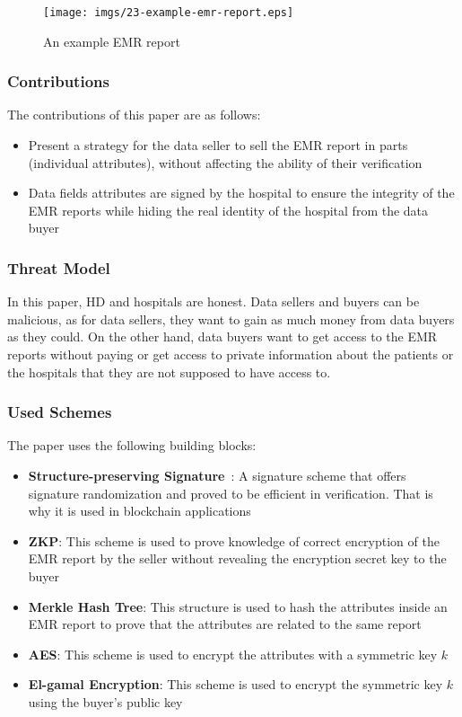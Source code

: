 \begin{figure}
\centering
  \texttt{[image: imgs/23-example-emr-report.eps]}
  \caption{An example EMR report~\cite{xue2023blockchain}}
  \label{fig:example-emr-report}
\end{figure}

\subsubsection{Contributions}
The contributions of this paper are as follows:
\begin{itemize}
    \item Present a strategy for the data seller to sell the EMR report in parts (individual attributes), without affecting the ability of their verification
    \item Data fields attributes are signed by the hospital to ensure the integrity of the EMR reports while hiding the real identity of the hospital from the data buyer
\end{itemize}

\subsubsection{Threat Model}
In this paper, HD and hospitals are honest.
Data sellers and buyers can be malicious, as for data sellers, they want to gain as much money from data buyers as they could.
On the other hand, data buyers want to get access to the EMR reports without paying or get access to private information about the patients or the hospitals that they are not supposed to have access to.

\subsubsection{Used Schemes}
The paper uses the following building blocks:

\begin{itemize}
    \item \textbf{Structure-preserving Signature}~\cite{gay2018more}: A signature scheme that offers signature randomization and proved to be efficient in verification. That is why it is used in blockchain applications
    \item \textbf{ZKP}: This scheme is used to prove knowledge of correct encryption of the EMR report by the seller without revealing the encryption secret key to the buyer
    \item \textbf{Merkle Hash Tree}: This structure is used to hash the attributes inside an EMR report to prove that the attributes are related to the same report
    \item \textbf{AES}: This scheme is used to encrypt the attributes with a symmetric key $k$
    \item \textbf{El-gamal Encryption}: This scheme is used to encrypt the symmetric key $k$ using the buyer's public key
\end{itemize}

